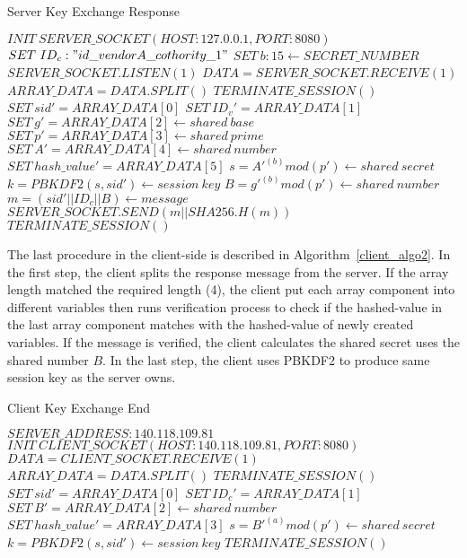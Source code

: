 \begin{algorithm}[H]
	\caption{Server Key Exchange Response}\label{server_algo}
	\begin{algorithmic}[1]
		\State $INIT\ SERVER\_SOCKET(HOST:127.0.0.1,PORT:8080)$
		\State $SET\ ID_c:"id\_vendorA\_cothority\_1"$
		\State $SET\ b:15 \gets SECRET\_NUMBER$
		\State $SERVER\_SOCKET.LISTEN(1)$
		\State $DATA = SERVER\_SOCKET.RECEIVE(1)$
		\State $ARRAY\_DATA = DATA.SPLIT()$
		\State $TERMINATE\_SESSION()$
		\EndIf
		\State $SET\ sid'=ARRAY\_DATA[0]$
		\State $SET\ ID_v'=ARRAY\_DATA[1]$
		\State $SET\ g'=ARRAY\_DATA[2] \gets shared\ base$
		\State $SET\ p'=ARRAY\_DATA[3] \gets shared\ prime$
		\State $SET\ A'=ARRAY\_DATA[4] \gets shared\ number$
		\State $SET\ hash\_value'=ARRAY\_DATA[5]$
		\State $s=A'^{(b)}mod(p') \gets shared\ secret$
		\State $k=PBKDF2(s,sid') \gets session\ key$
		\State $B=g'^{(b)}mod(p') \gets shared\ number$
		\State $m=(sid'||ID_c||B) \gets message$
		\State $SERVER\_SOCKET.SEND(m||SHA256.H(m))$
		\EndIf
		\Else
		\State $TERMINATE\_SESSION()$
		\EndIf
		\EndProcedure
	\end{algorithmic}
\end{algorithm}

The last procedure in the client-side is described in Algorithm~\ref{client_algo2}. In the first step, the client splits the response message from the server. If the array length matched the required length (4), the client put each array component into different variables then runs verification process to check if the hashed-value in the last array component matches with the hashed-value of newly created variables. If the message is verified, the client calculates the shared secret uses the shared number $B$. In the last step, the client uses PBKDF2 to produce same session key as the server owns.


\begin{algorithm}[H]
	\caption{Client Key Exchange End}\label{client_algo2}
	\begin{algorithmic}[1]
		\State $SERVER\_ADDRESS:140.118.109.81$
		\State $INIT\ CLIENT\_SOCKET(HOST:140.118.109.81,PORT:8080)$
		\State $DATA = CLIENT\_SOCKET.RECEIVE(1)$
		\State $ARRAY\_DATA = DATA.SPLIT()$
		\State $TERMINATE\_SESSION()$
		\EndIf
		\State $SET\ sid'=ARRAY\_DATA[0]$
		\State $SET\ ID_c'=ARRAY\_DATA[1]$
		\State $SET\ B'=ARRAY\_DATA[2] \gets shared\ number$
		\State $SET\ hash\_value'=ARRAY\_DATA[3]$
		\State $s=B'^{(a)}mod(p') \gets shared\ secret$
		\State $k=PBKDF2(s,sid') \gets session\ key$
		\EndIf
		\Else
		\State $TERMINATE\_SESSION()$
		\EndIf
		\EndProcedure
	\end{algorithmic}
\end{algorithm}


